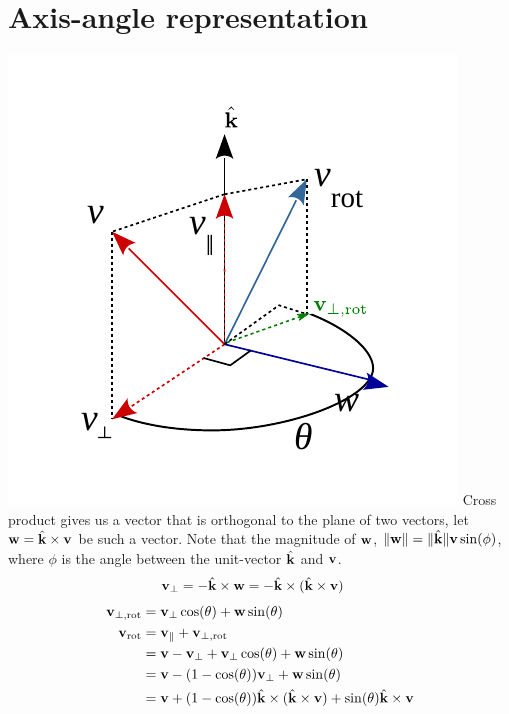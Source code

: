 \documentclass[twocolumn]{article}
\begin{document}
\section{Axis-angle representation}
\includegraphics[width=\linewidth]{media/Rodrigues-formula.pdf}
%
Cross product gives us a vector that is orthogonal to the plane of two vectors,
let $\mathbf{w} = \hat{\mathbf{k}} \times \mathbf{v}$ be such a vector. Note that the magnitude of
$\mathbf{w}$, $\|\mathbf{w}\| = \|\hat{\mathbf{k}}\| \mathbf{v} \sin(\phi)$, where $\phi$ is the angle
between the unit-vector $\hat{\mathbf{k}}$ and $\mathbf{v}$.
\begin{align}
  \mathbf{v}_\perp &= - \hat{\mathbf{k}} \times \mathbf{w} = -  \hat{\mathbf{k}} \times (\hat{\mathbf{k}} \times \mathbf{v})
\end{align}
\begin{align}
  \mathbf{v}_{\perp,\text{rot}}  &= \mathbf{v}_\perp\cos(\theta) + \mathbf{w}\sin(\theta)
  \\
  \mathbf{v}_{\text{rot}} &=  \mathbf{v}_\parallel +   \mathbf{v}_{\perp,\text{rot}}
  \notag\\
       &=  \mathbf{v} - \mathbf{v}_\perp +   \mathbf{v}_\perp\cos(\theta) + \mathbf{w}\sin(\theta)
  \notag\\
       &=  \mathbf{v} - (1-\cos(\theta)) \mathbf{v}_\perp + \mathbf{w} \sin(\theta)
  \notag\\
       &=  \mathbf{v} + (1-\cos(\theta)) \hat{\mathbf{k}} \times (\hat{\mathbf{k}} \times \mathbf{v}) +  \sin(\theta) \hat{\mathbf{k}} \times \mathbf{v}
\end{align}
\end{document}
